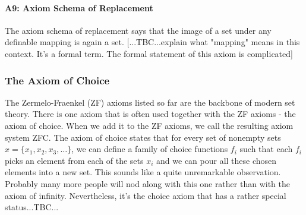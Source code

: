 

\paragraph{A9: Axiom Schema of Replacement} The axiom schema of replacement says that the image of a set under any definable mapping is again a set. [...TBC...explain what "mapping" means in this context. It's a formal term. The formal statement of this axiom is complicated]


\subsubsection{The Axiom of Choice}
The Zermelo-Fraenkel (ZF) axioms listed so far are the backbone of modern set theory. There is one axiom that is often used together with the ZF axioms - the axiom of choice. When we add it to the ZF axioms, we call the resulting axiom system ZFC. The axiom of choice states that for every set of nonempty sets $x = \{ x_1, x_2, x_3, \ldots \}$, we can define a family of choice functions $f_i$ such that each $f_i$ picks an element from each of the sets $x_i$ and we can pour all these chosen elements into a new set. This sounds like a quite unremarkable observation. Probably many more people will nod along with this one rather than with the axiom of infinity. Nevertheless, it's the choice axiom that has a rather special status...TBC...


